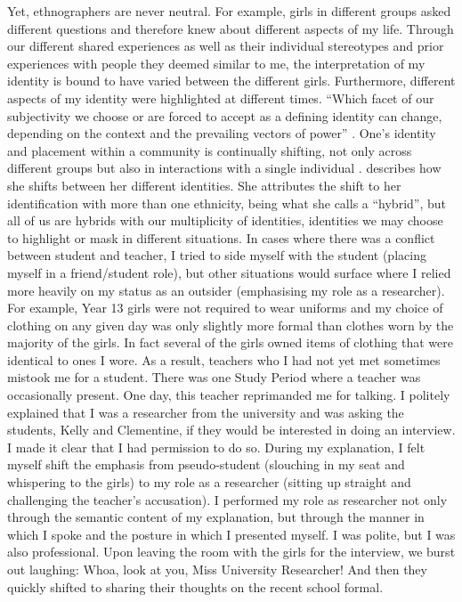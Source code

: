 
Yet, ethnographers are never neutral. For example, girls in different groups asked different questions and therefore knew about different aspects of my life. Through our different shared experiences as well as their individual stereotypes and prior experiences with people they deemed similar to me, the interpretation of my identity is bound to have varied between the different girls. Furthermore, different aspects of my identity were highlighted at different times. ``Which facet of our subjectivity we choose or are forced to accept as a defining identity can change, depending on the context and the prevailing vectors of power'' \citep[676]{narayan1993}. One's identity and placement within a community is continually shifting, not only across different groups but also in interactions with a single individual \citep[680]{narayan1993}. \citet{mani1990} describes how she shifts between her different identities. She attributes the shift to her identification with more than one ethnicity, being what she calls a ``hybrid'', but all of us are hybrids with our multiplicity of identities, identities we may choose to highlight or mask in different situations. In cases where there was a conflict between student and teacher, I tried to side myself with the student (placing myself in a friend/student role), but other situations would surface where I relied more heavily on my status as an outsider (emphasising my role as a researcher). For example, Year 13 girls were not required to wear uniforms and my choice of clothing on any given day was only slightly more formal than clothes worn by the majority of the girls. In fact several of the girls owned items of clothing that were identical to ones I wore. As a result, teachers who I had not yet met sometimes mistook me for a student. There was one Study Period where a teacher was occasionally present. One day, this teacher reprimanded me for talking. I politely explained that I was a researcher from the university and was asking the students, Kelly and Clementine, if they would be interested in doing an interview. I made it clear that I had permission to do so. During my explanation, I felt myself shift the emphasis from pseudo-student (slouching in my seat and whispering to the girls) to my role as a researcher (sitting up straight and challenging the teacher's accusation). I performed my role as researcher not only through the semantic content of my explanation, but through the manner in which I spoke and the posture in which I presented myself. I was polite, but I was also professional. Upon leaving the room with the girls for the interview, we burst out laughing: Whoa, look at you, Miss University Researcher! And then they quickly shifted to sharing their thoughts on the recent school formal.


